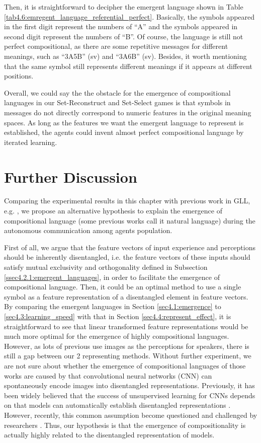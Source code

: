 Then, it is straightforward to decipher the emergent language shown in Table \ref{tab4.6:emregent_language_referential_perfect}. Basically, the symbols appeared in the first digit represent the numbers of ``A'' and the symbols appeared in second digit represent the numbers of ``B''. Of course, the language is still not perfect compositional, as there are some repetitive messages for different meanings, such as ``3A5B'' (sv) and ``3A6B'' (sv). Besides, it worth mentioning that the same symbol still represents different meanings if it appears at different positions.

Overall, we could say the the obstacle for the emergence of compositional languages in our Set-Reconstruct and Set-Select games is that symbols in messages do not directly correspond to numeric features in the original meaning spaces. As long as the features we want the emergent language to represent is established, the agents could invent almost perfect compositional language by iterated learning.

\section{Further Discussion}
\label{sec4.5:discuss}

Comparing the experimental results in this chapter with previous work in GLL, e.g. \cite{kottur2017natural, hermann2017grounded, havrylov2017emergence, mordatch2018emergence}, we propose an alternative hypothesis to explain the emergence of compositional language (some previous works call it natural language) during the autonomous communication among agents population.

First of all, we argue that the feature vectors of input experience and perceptions should be inherently disentangled, i.e. the feature vectors of these inputs should satisfy mutual exclusivity and orthogonality defined in Subsection \ref{ssec4.2.1:emergent_languages}, in order to facilitate the emergence of compositional language. Then, it could be an optimal method to use a single symbol as a feature representation of a disentangled element in feature vectors. By comparing the emergent languages in Section \ref{sec4.1:emergence} to \ref{sec4.3:learning_speed} with that in Section \ref{sec4.4:represent_effect}, it is straightforward to see that linear transformed feature representations would be much more optimal for the emergence of highly compositional languages. However, as lots of previous use images as the perceptions for speakers, there is still a gap between our 2 representing methods. Without further experiment, we are not sure about whether the emergence of compositional languages of those works are caused by that convolutional neural networks (CNN) can spontaneously encode images into disentangled representations. Previously, it has been widely believed that the success of unsupervised learning for CNNs depends on that models can automatically establish disentangled representations \cite{bengio2013representation}. However, recently, this common assumption become questioned and challenged by researchers \cite{locatello2018challenging}. Thus, our hypothesis is that the emergence of compositionality is actually highly related to the disentangled representation of models.

